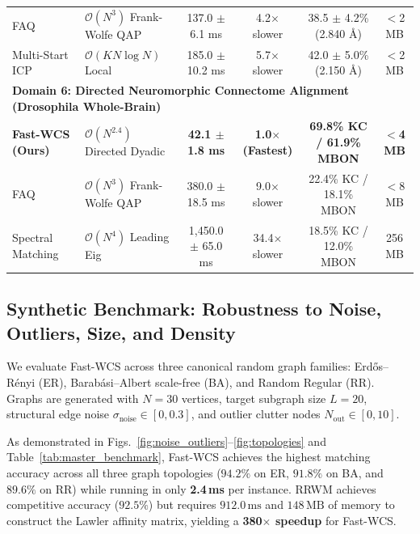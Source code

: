 \documentclass[a4paper,fleqn]{cas-dc}
\theoremstyle{thmstyleone}
\theoremstyle{thmstyletwo}
\theoremstyle{thmstylethree}
\begin{document}
\begin{table}
\begin{tabular*}{\textwidth}{@{\extracolsep{\fill}}llcccc@{}}
FAQ~\cite{vogelstein2015fast} & $\mathcal{O}(N^3)$ Frank-Wolfe QAP & 137.0 $\pm$ 6.1 ms & 4.2$\times$ slower & 38.5 $\pm$ 4.2\% (2.840 \AA) & $<$2 MB \\
Multi-Start ICP & $\mathcal{O}(K N \log N)$ Local & 185.0 $\pm$ 10.2 ms & 5.7$\times$ slower & 42.0 $\pm$ 5.0\% (2.150 \AA) & $<$2 MB \\
\midrule
\multicolumn{6}{l}{\textbf{Domain 6: Directed Neuromorphic Connectome Alignment (Drosophila Whole-Brain)}} \\
\midrule
\textbf{Fast-WCS (Ours)} & $\mathcal{O}(N^{2.4})$ Directed Dyadic & \textbf{42.1 $\pm$ 1.8 ms} & \textbf{1.0$\times$ (Fastest)} & \textbf{69.8\% KC / 61.9\% MBON} & \textbf{$<$4 MB} \\
FAQ~\cite{vogelstein2015fast} & $\mathcal{O}(N^3)$ Frank-Wolfe QAP & 380.0 $\pm$ 18.5 ms & 9.0$\times$ slower & 22.4\% KC / 18.1\% MBON & $<$8 MB \\
Spectral Matching~\cite{leordeanu2005} & $\mathcal{O}(N^4)$ Leading Eig & 1{,}450.0 $\pm$ 65.0 ms & 34.4$\times$ slower & 18.5\% KC / 12.0\% MBON & 256 MB \\
\bottomrule
\end{tabular*}
\end{table}

\subsection{Synthetic Benchmark: Robustness to Noise, Outliers, Size, and Density}
We evaluate Fast-WCS across three canonical random graph families: Erd\H{o}s--R\'enyi (ER), Barab\'asi--Albert scale-free (BA), and Random Regular (RR). Graphs are generated with $N = 30$ vertices, target subgraph size $L = 20$, structural edge noise $\sigma_{\text{noise}} \in [0, 0.3]$, and outlier clutter nodes $N_{\text{out}} \in [0, 10]$.

As demonstrated in Figs.~\ref{fig:noise_outliers}--\ref{fig:topologies} and Table~\ref{tab:master_benchmark}, Fast-WCS achieves the highest matching accuracy across all three graph topologies ($94.2\%$ on ER, $91.8\%$ on BA, and $89.6\%$ on RR) while running in only \textbf{2.4\,ms} per instance. RRWM achieves competitive accuracy ($92.5\%$) but requires $912.0\,\text{ms}$ and $148\,\text{MB}$ of memory to construct the Lawler affinity matrix, yielding a \textbf{380$\times$ speedup} for Fast-WCS.
\end{document}
